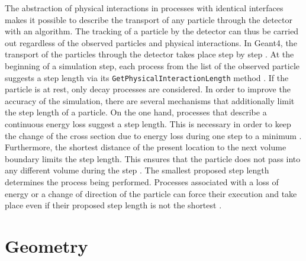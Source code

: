 \documentclass[12pt, a4paper]{thesis}
\begin{document}
The abstraction of physical interactions in processes with identical
interfaces makes it possible to describe the transport of any particle
through the detector with an algorithm. The tracking of a particle by
the detector can thus be carried out regardless of the observed
particles and physical interactions.  In Geant4, the transport of the
particles through the detector takes place step by step
\cite{geant_simul_toolk}.  At the beginning of a simulation step, each
process from the list of the observed particle suggests a step length
via its \texttt{GetPhysicalInteractionLength} method
\cite{geant_simul_toolk}. If the particle is at rest, only decay
processes are considered. In order to improve the accuracy of the
simulation, there are several mechanisms that additionally limit the
step length of a particle. On the one hand, processes that describe a
continuous energy loss suggest a step length. This is necessary in
order to keep the change of the cross section due to energy loss
during one step to a minimum \cite{geant4-phys-ref}. Furthermore, the
shortest distance of the present location to the next volume boundary
limits the step length.  This ensures that the particle does not pass
into any different volume during the step \cite{geant4-rec-dev}. The
smallest proposed step length determines the process being
performed. Processes associated with a loss of energy or a change of
direction of the particle can force their execution and take place
even if their proposed step length is not the shortest
\cite{geant_simul_toolk}.

\section{Geometry}
\label{sec:org8d2fc6f}
\end{document}

